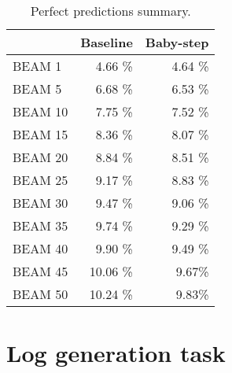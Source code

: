 \begin{table}[h!]
    \centering
    \begin{tabular}{l|r|r} 
    & Baseline & Baby-step\\ [0.5ex] 
    \hline
    BEAM 1 & 4.66 \% & 4.64 \%\\  
    BEAM 5 & 6.68 \% & 6.53 \% \\ 
    BEAM 10 & 7.75 \% & 7.52 \%\\
    BEAM 15 & 8.36 \% & 8.07 \%\\
    BEAM 20 & 8.84 \% & 8.51 \%\\
    BEAM 25 & 9.17 \% & 8.83 \%\\
    BEAM 30 & 9.47 \% & 9.06 \%\\
    BEAM 35 & 9.74 \% & 9.29 \%\\
    BEAM 40 & 9.90 \% & 9.49 \%\\
    BEAM 45 & 10.06 \%& 9.67\%\\
    BEAM 50 & 10.24 \%& 9.83\%\\ [1ex]
    \end{tabular}
    \caption{Perfect predictions summary.}
    \label{table:2}
\end{table}
\section{Log generation task}